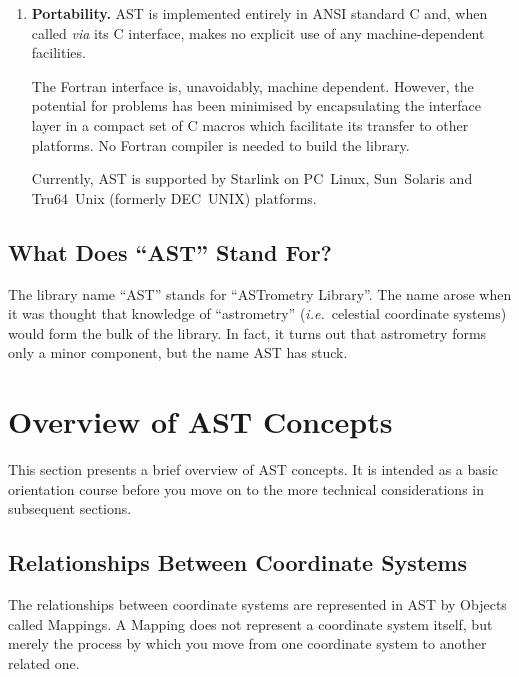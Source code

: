 \documentclass[twoside,11pt]{article}
\newcommand{\htmlref}[2]{#1}
\begin{document}
\begin{enumerate}
\item {\bf{Portability.}}
AST is implemented entirely in ANSI standard C and, when called
{\em{via}} its C interface, makes no explicit use of any
machine-dependent facilities.

The Fortran interface is, unavoidably, machine dependent. However, the
potential for problems has been minimised by encapsulating the
interface layer in a compact set of C macros which facilitate its
transfer to other platforms. No Fortran compiler is needed to build
the library.

Currently, AST is supported by Starlink on PC~Linux, Sun~Solaris and
Tru64~Unix (formerly DEC~UNIX) platforms.
\end{enumerate}

\subsection{What Does ``AST'' Stand For?}

The library name ``AST'' stands for ``ASTrometry Library''. The name
arose when it was thought that knowledge of ``astrometry''
({\em{i.e.}}\ celestial coordinate systems) would form the bulk of the
library.  In fact, it turns out that astrometry forms only a minor
component, but the name AST has stuck.

\cleardoublepage
\section{Overview of AST Concepts}

This section presents a brief overview of AST concepts. It is intended
as a basic orientation course before you move on to the more technical
considerations in subsequent sections.

\subsection{\label{ss:mappingoverview}Relationships Between Coordinate Systems}

The relationships between coordinate systems are represented in AST by
Objects called Mappings. A \htmlref{Mapping}{Mapping} does not represent a coordinate
system itself, but merely the process by which you move from one
coordinate system to another related one.
 
\end{document}
